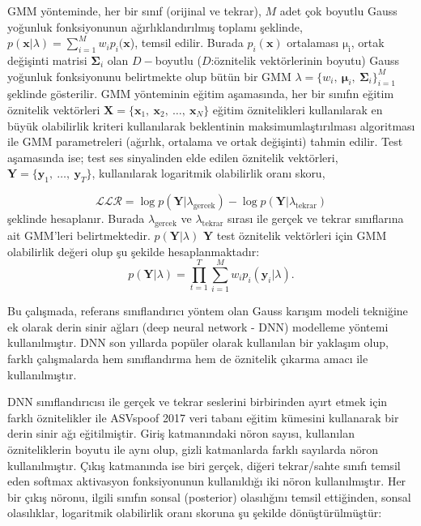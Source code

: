 \documentclass[conference, a4paper]{IEEEtran}
\begin{document}
GMM yönteminde, her bir sınıf (orijinal ve tekrar), $M$ adet çok boyutlu Gauss yoğunluk fonksiyonunun
ağırlıklandırılmış toplamı şeklinde, $p(\mathbf{x}|\lambda)=\sum_{i=1}^Mw_ip_i(\mathbf{x}$), temsil edilir. Burada
$p_i(\mathbf{x})$ ortalaması $\mathbf{\mathrm{\mu_i}}$, ortak değişinti matrisi $\mathbf{\Sigma}_i$ olan $D-$boyutlu
($D$:öznitelik vektörlerinin boyutu) Gauss yoğunluk fonksiyonunu belirtmekte olup bütün bir GMM
$\lambda=\{w_i,\:\mathrm{\mathbf{\mu}}_i,\:\mathbf{\Sigma}_i\}_{i=1}^M$ şeklinde gösterilir. GMM yönteminin eğitim
aşamasında, her bir sınıfın eğitim öznitelik vektörleri
$\mathbf{X}=\{\mathbf{x}_1,\:\mathbf{x}_2,\:\ldots,\:\mathbf{x}_N \}$ eğitim öznitelikleri kullanılarak en büyük
olabilirlik kriteri kullanılarak beklentinin maksimumlaştırılması algoritması ile GMM parametreleri (ağırlık,
ortalama ve ortak değişinti) tahmin edilir. Test aşamasında ise; test ses sinyalinden elde edilen öznitelik
vektörleri, $\mathbf{Y}=\{\mathbf{y}_1,\:\ldots,\:\mathbf{y}_T\}$, kullanılarak logaritmik olabilirlik oranı skoru,

\begin{equation}
    \mathcal{LLR}=\log p(\mathbf{Y}|\lambda_\mathrm{gercek})-\log p(\mathbf{Y}|\lambda_\mathrm{tekrar})
\end{equation}
şeklinde hesaplanır. Burada $\lambda_\mathrm{gercek}$ ve $\lambda_\mathrm{tekrar}$ sırası ile gerçek ve tekrar
sınıflarına ait GMM'leri belirtmektedir. $p(\mathbf{Y}|\lambda)$ $\mathbf{Y}$ test öznitelik vektörleri için GMM
olabilirlik değeri olup şu şekilde hesaplanmaktadır:
\begin{equation}
    p(\mathbf{Y}|\lambda) = \prod_{t=1}^T \sum_{i=1}^M w_i p_i(\mathbf{y}_i|\lambda).
\end{equation}

Bu çalışmada, referans sınıflandırıcı yöntem olan Gauss karışım modeli tekniğine ek olarak derin sinir ağları
(deep neural network - DNN) modelleme yöntemi kullanılmıştır. DNN son yıllarda popüler olarak kullanılan bir yaklaşım
olup, farklı çalışmalarda hem sınıflandırma hem de öznitelik çıkarma amacı ile kullanılmıştır.

DNN sınıflandırıcısı ile gerçek ve tekrar seslerini birbirinden ayırt etmek için farklı öznitelikler ile ASVspoof 2017
veri tabanı eğitim kümesini kullanarak bir derin sinir ağı eğitilmiştir. Giriş katmanındaki nöron sayısı, kullanılan
özniteliklerin boyutu ile aynı olup, gizli katmanlarda farklı sayılarda nöron kullanılmıştır. Çıkış katmanında ise
biri gerçek, diğeri tekrar/sahte sınıfı temsil eden softmax aktivasyon fonksiyonunun kullanıldığı iki nöron
kullanılmıştır. Her bir çıkış nöronu, ilgili sınıfın sonsal (posterior) olasılığını temsil ettiğinden, sonsal
olasılıklar, logaritmik olabilirlik oranı skoruna şu şekilde dönüştürülmüştür:
\end{document}

